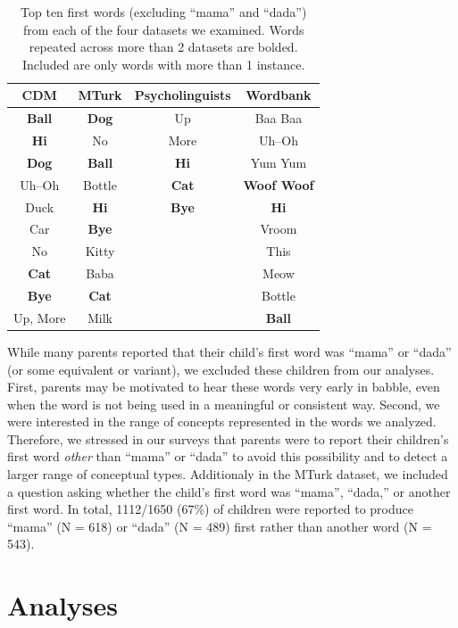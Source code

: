 \documentclass[10pt,letterpaper]{article}
\begin{document}
\begin{table}[tb]
\centering
\begin{tabular}{cccc}
\hline
{\bf CDM} & {\bf MTurk} & {\bf Psycholinguists} & {\bf Wordbank} \\ 
\hline
\textbf{Ball} & \textbf{Dog} & Up & Baa Baa \\ 
\textbf{Hi} & No & More & Uh--Oh \\
\textbf{Dog} & \textbf{Ball} & \textbf{Hi} & Yum Yum \\ 
Uh--Oh & Bottle & \textbf{Cat} & \textbf{Woof Woof} \\ 
Duck & \textbf{Hi} & \textbf{Bye} & \textbf{Hi} \\
Car & \textbf{Bye} &  & Vroom \\
No & Kitty &  & This \\
\textbf{Cat} & Baba &  & Meow \\
\textbf{Bye} & \textbf{Cat} &  & Bottle \\
Up, More & Milk &  & \textbf{Ball} \\
\hline 
\end{tabular}
\caption{\label{tab:top10} Top ten first words (excluding ``mama'' and ``dada'') from each of the four datasets we examined. Words repeated across more than 2 datasets are bolded. Included are only words with more than 1 instance.}
\vspace{-3em}
\end{table}


While many parents reported that their child's first word was ``mama'' or ``dada'' (or some equivalent or variant), we excluded these children from our analyses. First, parents may be motivated to hear these words very early in babble, even when the word is not being used in a meaningful or consistent way. Second, we were interested in the range of concepts represented in the words we analyzed. Therefore, we stressed in our surveys that parents were to report their children's first word \emph{other} than ``mama'' or ``dada'' to avoid this possibility and to detect a larger range of conceptual types. Additionaly in the MTurk dataset, we included a question asking whether the child's first word was ``mama'', ``dada,'' or another first word. In total, 1112/1650 (67\%) of children were reported to produce ``mama'' (N = 618) or ``dada'' (N = 489) first rather than another word (N = 543).

\section{Analyses}
\end{document}
